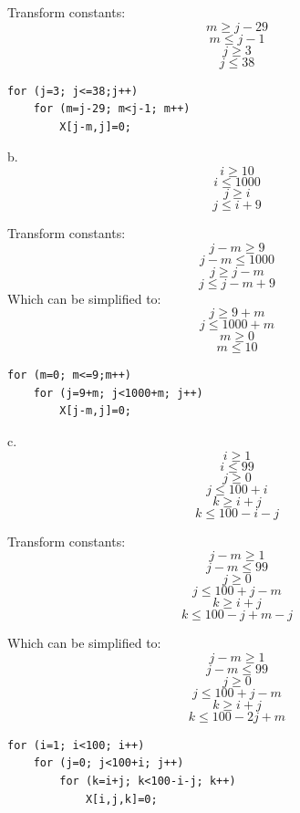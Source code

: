 \documentclass[11pt]{article}
\begin{document}
\begin{enumerate}
\begin{Answer}
		Transform constants:
		$$m \ge j - 29$$
		$$m \le j - 1$$
		$$j \ge 3$$
		$$j \le 38$$
\begin{verbatim}
for (j=3; j<=38;j++)
    for (m=j-29; m<j-1; m++)
        X[j-m,j]=0;
\end{verbatim}
		
		b.
		$$i \ge 10$$
		$$i \le 1000$$
		$$j \ge i$$
		$$j \le i + 9$$
		
		Transform constants:
		$$j - m \ge 9$$
		$$j - m \le 1000$$
		$$j \ge j - m$$
		$$j \le j - m + 9$$
		Which can be simplified to:
		$$j \ge 9 + m$$
		$$j \le 1000 + m$$
		$$m \ge 0$$
		$$m \le 10$$

\begin{verbatim}
for (m=0; m<=9;m++) 
    for (j=9+m; j<1000+m; j++)
        X[j-m,j]=0;
\end{verbatim}	
		c.
		$$i \ge 1$$
		$$i \le 99$$
		$$j \ge 0$$
		$$j \le 100 + i$$
		$$k \ge i + j$$
		$$k \le 100 - i - j$$
		
		Transform constants:
		$$j - m \ge 1$$
		$$j - m \le 99$$
		$$j \ge 0$$
		$$j \le 100 + j - m$$
		$$k \ge i + j$$
		$$k \le 100 - j + m - j$$
		
		Which can be simplified to:
		$$j - m \ge 1$$
		$$j - m \le 99$$
		$$j \ge 0$$
		$$j \le 100 + j - m$$
		$$k \ge i + j$$
		$$k \le 100 - 2j + m$$
		
\begin{verbatim}
for (i=1; i<100; i++)
    for (j=0; j<100+i; j++)
        for (k=i+j; k<100-i-j; k++) 
            X[i,j,k]=0;
\end{verbatim}
		\end{Answer}
\end{enumerate}
\end{document}

